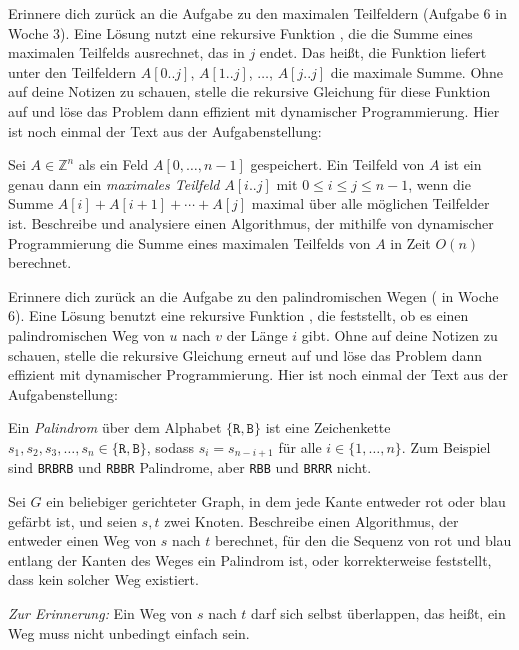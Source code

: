 \documentclass{uebung_cs}
\begin{document}
\begin{aufgabe}
    Erinnere dich zurück an die Aufgabe zu den maximalen Teilfeldern (Aufgabe 6 in Woche 3).
    Eine Lösung nutzt eine rekursive Funktion
    , die die Summe eines maximalen Teilfelds ausrechnet, das in $j$ endet. Das heißt, die Funktion liefert unter den Teilfeldern $A[0..j]$, $A[1..j]$, $\dots$, $A[j..j]$ die maximale Summe.
    Ohne auf deine Notizen zu schauen, stelle die rekursive Gleichung für diese Funktion auf und löse das Problem dann effizient mit dynamischer Programmierung. Hier ist noch einmal der Text aus der Aufgabenstellung:

    Sei $A \in \mathbb{Z}^n$ als ein Feld $A[0, \dots, n-1]$ gespeichert.
	Ein Teilfeld von $A$ ist ein genau dann ein \textit{maximales Teilfeld} $A[i..j]$ mit $0\leq i\leq j\leq n-1$, wenn die Summe $A[i] + A[i+1] + \cdots + A[j]$ maximal über alle möglichen Teilfelder ist.
    Beschreibe und analysiere einen Algorithmus, der mithilfe von dynamischer Programmierung die Summe eines maximalen Teilfelds von $A$ in Zeit $O(n)$ berechnet.
\end{aufgabe}

\begin{aufgabe}
    Erinnere dich zurück an die Aufgabe zu den palindromischen Wegen ( in Woche 6).
    Eine Lösung benutzt eine rekursive Funktion , die feststellt, ob es einen palindromischen Weg von $u$ nach $v$ der Länge $i$ gibt.
    Ohne auf deine Notizen zu schauen, stelle die rekursive Gleichung erneut auf und löse das Problem dann effizient mit dynamischer Programmierung. Hier ist noch einmal der Text aus der Aufgabenstellung:

    Ein \emph{Palindrom} über dem Alphabet $\{\texttt{R},\texttt{B}\}$ ist eine Zeichenkette $s_1,s_2,s_3,\dots,s_n\in\{\texttt{R},\texttt{B}\}$, sodass $s_i=s_{n-i+1}$ für alle $i\in\{1,\dots,n\}$. Zum Beispiel sind \texttt{BRBRB} und \texttt{RBBR} Palindrome, aber \texttt{RBB} und \texttt{BRRR} nicht.

Sei $G$ ein beliebiger gerichteter Graph, in dem jede Kante entweder rot oder blau gefärbt ist, und seien $s,t$ zwei Knoten.
Beschreibe einen Algorithmus, der entweder einen Weg von $s$ nach $t$ berechnet, für den die Sequenz von rot und blau entlang der Kanten des Weges ein Palindrom ist, oder korrekterweise feststellt, dass kein solcher Weg existiert.

\emph{Zur Erinnerung:} Ein Weg von $s$ nach $t$ darf sich selbst überlappen, das heißt, ein Weg muss nicht unbedingt einfach sein.
\end{aufgabe}
\end{document}
